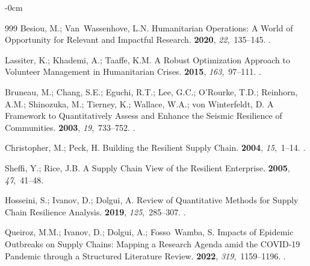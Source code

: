 \documentclass[systems,article,accept,moreauthors,pdftex]{Definitions/mdpi}
\begin{document}
\begin{adjustwidth}{-\extralength}{0cm}
\begin{thebibliography}{999}
Besiou, M.; Van~Wassenhove, L.N.
\newblock Humanitarian Operations: A World of Opportunity for Relevant and
  Impactful Research.
 {\bf 2020}, {\em
  22},~135--145.
.

Lassiter, K.; Khademi, A.; Taaffe, K.M.
\newblock A Robust Optimization Approach to Volunteer Management in
  Humanitarian Crises.
 {\bf 2015}, {\em
  163},~97--111.
.

Bruneau, M.; Chang, S.E.; Eguchi, R.T.; Lee, G.C.; O'Rourke, T.D.; Reinhorn,
  A.M.; Shinozuka, M.; Tierney, K.; Wallace, W.A.; \linebreak  von Winterfeldt, D.
\newblock A Framework to Quantitatively Assess and Enhance the Seismic
  Resilience of Communities.
 {\bf 2003}, {\em 19},~733--752.
.

Christopher, M.; Peck, H.
\newblock Building the Resilient Supply Chain.
 {\bf 2004},
  {\em 15},~1--14.
.

Sheffi, Y.; Rice, J.B.
\newblock A Supply Chain View of the Resilient Enterprise.
 {\bf 2005}, {\em 47},~41--48.

Hosseini, S.; Ivanov, D.; Dolgui, A.
\newblock Review of Quantitative Methods for Supply Chain Resilience Analysis.
 {\bf 2019}, {\em 125},~285--307.
.

Queiroz, M.M.; Ivanov, D.; Dolgui, A.; Fosso~Wamba, S.
\newblock Impacts of Epidemic Outbreaks on Supply Chains: Mapping a Research
  Agenda amid the {COVID-19} Pandemic through a Structured Literature Review.
 {\bf 2022}, {\em
  319},~1159--1196.
.


\end{thebibliography}
\end{adjustwidth}
\end{document}
